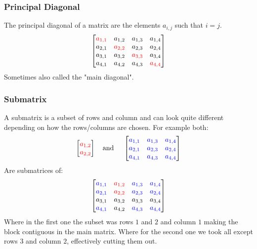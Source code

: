 \subsubsection{Principal Diagonal}
The principal diagonal of a matrix are the elements $a_{i,j}$ such that $i=j$. 
\[\begin{bmatrix}
	\color{red} a_{1,1}&a_{1,2}&a_{1,3}&a_{1,4} \\
	a_{2,1}&\color{red} a_{2,2}&a_{2,3}&a_{2,4} \\
	a_{3,1}&a_{3,2}&\color{red} a_{3,3}&a_{3,4} \\
	a_{4,1}&a_{4,2}&a_{4,3}&\color{red} a_{4,4} \\
\end{bmatrix}\]
Sometimes also called the "main diagonal".

\subsubsection{Submatrix}
A submatrix is a subset of rows and column and can look quite different depending on how the rows/columns are chosen.
For example both:
\[
\begin{bmatrix}
	\color{red} a_{1,2} \\
	\color{red} a_{2,2} \\
\end{bmatrix}
\quad\text{and}\quad
\
\begin{bmatrix}
	\color{blue} a_{1,1}&\color{blue} a_{1,3}&\color{blue} a_{1,4} \\
	\color{blue} a_{2,1}&\color{blue} a_{2,3}&\color{blue} a_{2,4} \\
	\color{blue} a_{4,1}&\color{blue} a_{4,3}&\color{blue} a_{4,4} \\
\end{bmatrix}\]
Are submatrices of:
\[\begin{bmatrix}
	\color{blue} a_{1,1}&\color{red} a_{1,2}&\color{blue} a_{1,3}&\color{blue} a_{1,4} \\
	\color{blue} a_{2,1}&\color{red} a_{2,2}&\color{blue} a_{2,3}&\color{blue} a_{2,4} \\
	a_{3,1}&a_{3,2}&a_{3,3}&a_{3,4} \\
	\color{blue} a_{4,1}&a_{4,2}&\color{blue} a_{4,3}&\color{blue} a_{4,4} \\
\end{bmatrix}\]
Where in the first one the subset was rows $1$ and $2$ and column $1$ making the block contiguous in the main matrix.
Where for the second one we took all except rows $3$ and column $2$, effectively cutting them out.

